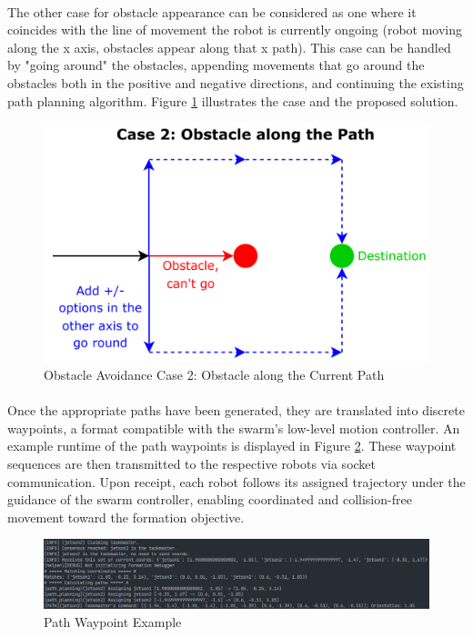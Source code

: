 \paragraph*{}
The other case for obstacle appearance can be considered as one where it coincides with the line of movement the robot is currently ongoing (robot moving along the x axis, obstacles appear along that x path). This case can be handled by "going around" the obstacles, appending movements that go around the obstacles both in the positive and negative directions, and continuing the existing path planning algorithm. Figure \ref{fig:obstacle-avoidance-case-2} illustrates the case and the proposed solution.

\begin{figure} [H]
    \centering
    \includegraphics[width=0.75\linewidth]{assets/images/formation/obstacle-avoidance-case2.png}
    \caption{Obstacle Avoidance Case 2: Obstacle along the Current Path}
    \label{fig:obstacle-avoidance-case-2}
\end{figure}

\paragraph*{}
Once the appropriate paths have been generated, they are translated into discrete waypoints, a format compatible with the swarm’s low-level motion controller. An example runtime of the path waypoints is displayed in Figure \ref{fig:path-waypoint}. These waypoint sequences are then transmitted to the respective robots via socket communication. Upon receipt, each robot follows its assigned trajectory under the guidance of the swarm controller, enabling coordinated and collision-free movement toward the formation objective.

\begin{figure} [H]
    \centering
    \includegraphics[width=1\linewidth]{assets/images/formation/path-waypoint.png}
    \caption{Path Waypoint Example}
    \label{fig:path-waypoint}
\end{figure}

